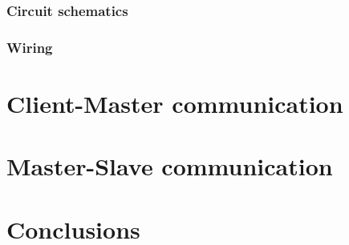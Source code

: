 \documentclass[binding=0.6cm,Lau]{sapthesis}
\begin{document}
\subsection{Circuit schematics}
\subsection{Wiring}

\chapter{Client-Master communication}
\label{ch:client-master-comm}

\chapter{Master-Slave communication}
\label{ch:master-slave-comm}

\chapter{Conclusions}
\label{ch:conclusions}


\backmatter
\cleardoublepage
{} %



\end{document}
